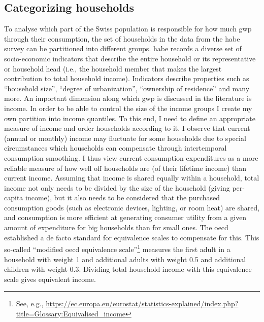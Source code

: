 \documentclass[a4paper,11pt,abstract=true]{scrartcl}
\begin{document}
\subsection*{Categorizing households}
To analyse which part of the Swiss population is responsible for how much \ac{gwp} through their consumption, the set of households in the data from the \ac{habe} survey can be partitioned into different groups.
\ac{habe} records a diverse set of socio-economic indicators that describe the entire household or its representative or household head (i.e., the household member that makes the largest contribution to total household income).
Indicators describe properties such as ``household size'', ``degree of urbanization'', ``ownership of residence'' and many more.
An important dimension along which \ac{gwp} is discussed in the literature is income.
In order to be able to control the size of the income groups I create my own partition into income quantiles. %
To this end, I need to define an appropriate measure of income and order households according to it.
I observe that current (annual or monthly) income may fluctuate for some households due to special circumstances which households can compensate through intertemporal consumption smoothing.
I thus view current consumption expenditures as a more reliable measure of how well off households are (of their lifetime income) than current income.
Assuming that income is shared equally within a household, total income not only needs to be divided by the size of the household (giving per-capita income), but it also needs to be considered that the purchased consumption goods (such as electronic devices, lighting, or room heat) are shared, and consumption is more efficient at generating consumer utility from a given amount of expenditure for big households than for small ones.
The \ac{oecd} established a de facto standard for equivalence scales to compensate for this.
This so-called ``modified \ac{oecd} equivalence scale''\footnote{%
  See, e.g., \url{https://ec.europa.eu/eurostat/statistics-explained/index.php?title=Glossary:Equivalised_income}
} measures the first adult in a household with weight 1 and additional adults with weight 0.5 and additional children with weight 0.3.
Dividing total household income with this equivalence scale gives equivalent income.
\end{document}

